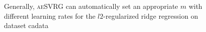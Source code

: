 \documentclass[conference]{IEEEtran}
\begin{document}
\begin{figure}[ht]
\caption{Generally, \textsc{aeSVRG} can automatically set an appropriate $m$ with different learning rates for the $l2$-regularized ridge regression on dataset cadata}
\label{figure_ridge_cadata}
\end{figure}
\end{document}

